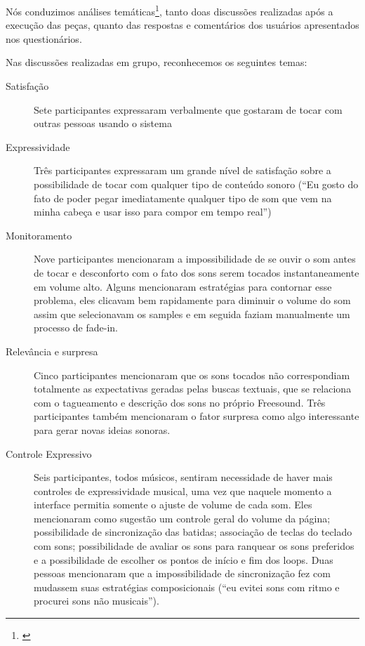 Nós conduzimos análises temáticas\footnote{\cite{Braun2006}}, tanto doas discussões realizadas após a execução das peças, quanto das respostas e comentários dos usuários apresentados nos questionários. 

Nas discussões realizadas em grupo, reconhecemos os seguintes temas:

\begin{description}
 \item[Satisfação] Sete participantes expressaram verbalmente que gostaram de tocar com outras pessoas usando o sistema

  \item[Expressividade] Três participantes expressaram um grande nível de satisfação sobre a possibilidade de tocar com qualquer tipo de conteúdo sonoro (``Eu gosto do fato de poder pegar imediatamente qualquer tipo de som que vem na minha cabeça e usar isso para compor em tempo real'')

 \item[Monitoramento] Nove participantes mencionaram a impossibilidade de se ouvir o som antes de tocar e desconforto com o fato dos sons serem tocados instantaneamente em volume alto. Alguns mencionaram estratégias para contornar esse problema, eles clicavam bem rapidamente para diminuir o volume do som assim que selecionavam os samples e em seguida faziam manualmente um processo de fade-in.

 \item[Relevância e surpresa] Cinco participantes mencionaram que os sons tocados não correspondiam totalmente as expectativas geradas pelas buscas textuais, que se relaciona com o tagueamento e descrição dos sons no próprio Freesound. Três participantes também mencionaram o fator surpresa como algo interessante para gerar novas ideias sonoras.

 \item[Controle Expressivo] Seis participantes, todos músicos, sentiram necessidade de haver mais controles de expressividade musical, uma vez que naquele momento a interface permitia somente o ajuste de volume de cada som. Eles mencionaram como sugestão um controle geral do volume da página; possibilidade de sincronização das batidas; associação de teclas do teclado com sons; possibilidade de avaliar os sons para ranquear os sons preferidos e a possibilidade de escolher os pontos de início e fim dos loops. Duas pessoas mencionaram que a impossibilidade de sincronização fez com mudassem suas estratégias composicionais (``eu evitei sons com ritmo e procurei sons não musicais'').


\end{description}
